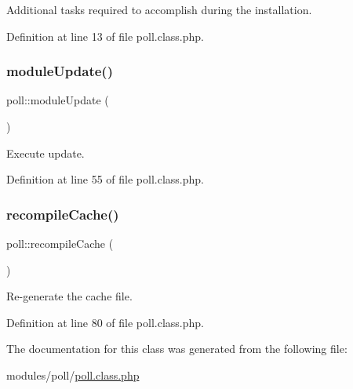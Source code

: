 Additional tasks required to accomplish during the installation. 



Definition at line 13 of file poll.\+class.\+php.

\hypertarget{classpoll_a3d8f63f173e74e8a19c61ee06f4ac02f}{}\label{classpoll_a3d8f63f173e74e8a19c61ee06f4ac02f} 
\subsubsection{\texorpdfstring{module\+Update()}{moduleUpdate()}}
{\footnotesize\ttfamily poll\+::module\+Update (\begin{DoxyParamCaption}{ }\end{DoxyParamCaption})}



Execute update. 



Definition at line 55 of file poll.\+class.\+php.

\hypertarget{classpoll_af1f9c058e0e622c4356cda133f9b988e}{}\label{classpoll_af1f9c058e0e622c4356cda133f9b988e} 
\subsubsection{\texorpdfstring{recompile\+Cache()}{recompileCache()}}
{\footnotesize\ttfamily poll\+::recompile\+Cache (\begin{DoxyParamCaption}{ }\end{DoxyParamCaption})}



Re-\/generate the cache file. 



Definition at line 80 of file poll.\+class.\+php.



The documentation for this class was generated from the following file\+:\begin{DoxyCompactItemize}
\item 
modules/poll/\hyperlink{poll_8class_8php}{poll.\+class.\+php}\end{DoxyCompactItemize}
